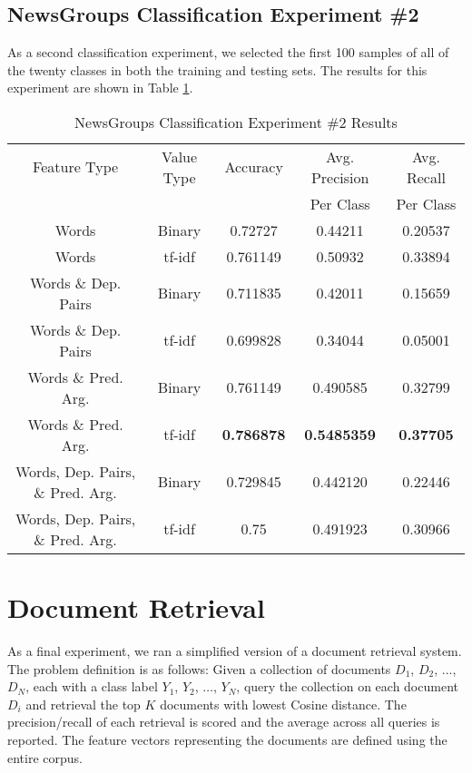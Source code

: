 \documentclass[11pt]{article}
\newcommand{\headcol}{\rowcolor{tableheadcolor}} %
\begin{document}
\subsection{NewsGroups Classification Experiment \#2}

As a second classification experiment, we selected the first 100 samples of all of the twenty classes in both the training and testing sets.  The results for this experiment are shown in Table \ref{tbl:NewsGroupsClassification2}.

\begin{table}[H]
\centering
\caption{NewsGroups Classification Experiment \#2 Results}
\label{tbl:NewsGroupsClassification2}
\begin{tabular}{|c|c|c|c|c|}
\hline
\headcol \color{white} Feature Type & \color{white} Value Type & \color{white} Accuracy & \color{white} Avg. Precision  & \color{white} Avg. Recall \\
 \headcol & & &  \color{white} Per Class & \color{white}  Per Class \\
\hline
Words & Binary & 0.72727 & 0.44211 &  0.20537  \\
Words & tf-idf &  0.761149  & 0.50932 & 0.33894\\
Words \& Dep. Pairs & Binary & 0.711835 & 0.42011 & 0.15659 \\
Words \& Dep. Pairs & tf-idf & 0.699828 & 0.34044 & 0.05001 \\
Words \& Pred. Arg. & Binary & 0.761149 & 0.490585 & 0.32799 \\
Words \& Pred. Arg.  & tf-idf & \textbf{0.786878} & \textbf{0.5485359} & \textbf{0.37705} \\
Words, Dep. Pairs, \& Pred. Arg. & Binary & 0.729845 & 0.442120 & 0.22446 \\
Words, Dep. Pairs, \& Pred. Arg.& tf-idf & 0.75 & 0.491923 & 0.30966 \\
\hline
\end{tabular}
\end{table}


\section{Document Retrieval}

As a final experiment, we ran a simplified version of a document retrieval system. The problem definition is as follows: Given a collection of documents $D_1$, $D_2$, $\dots$, $D_N$, each with a class label $Y_1$, $Y_2$, $\dots$, $Y_N$, query the collection on each document $D_i$ and retrieval the top $K$ documents with lowest Cosine distance. The precision/recall of each retrieval is scored and the average across all queries is reported. The feature vectors representing the documents are defined using the entire corpus. 
\end{document}
